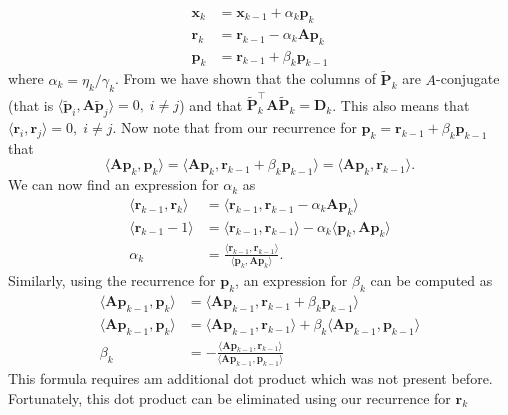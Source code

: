 \begin{align*}
    \bm{x}_k & = \bm{x}_{k-1} + \alpha_k \bm{p}_k        \\
    \bm{r}_k & = \bm{r}_{k-1} - \alpha_k \bm{A} \bm{p}_k \\
    \bm{p}_k & = \bm{r}_{k-1} + \beta_k \bm{p}_{k-1}
\end{align*}
where $\alpha_k = \eta_k / \gamma_k$. From  we have shown that the columns of $\tilde{\bm{P}}_k$ are $A$-conjugate (that is $\langle \tilde{\bm{p}}_i , \bm{A} \tilde{\bm{p}}_j \rangle = 0, \; i \neq j$) and that $\tilde{\bm{P}}_k^{\intercal} \bm{A} \tilde{\bm{P}}_k = \bm{D}_k$. This also means that $\langle \bm{r}_i , \bm{r}_j \rangle = 0, \; i \neq j$. Now note that from our recurrence for $\bm{p}_k = \bm{r}_{k-1} + \beta_k \bm{p}_{k-1}$ that
\[
    \langle \bm{A} \bm{p}_k ,\bm{p}_k \rangle = \langle \bm{A} \bm{p}_k , \bm{r}_{k-1} + \beta_k \bm{p}_{k-1} \rangle = \langle \bm{A} \bm{p}_k , \bm{r}_{k-1} \rangle.
\]
We can now find an expression for $\alpha_k$ as
\begin{align*}
    \langle \bm{r}_{k-1} , \bm{r}_{k} \rangle & = \langle \bm{r}_{k-1} , \bm{r}_{k-1} - \alpha_k \bm{A} \bm{p}_k \rangle                           \\
    \langle \bm{r}_{k-1} -1 \rangle           & = \langle \bm{r}_{k-1} , \bm{r}_{k-1} \rangle - \alpha_k \langle \bm{p}_k, \bm{A} \bm{p}_k \rangle \\
    \alpha_k                                  & = \frac{\langle \bm{r}_{k-1} , \bm{r}_{k-1} \rangle}{\langle \bm{p}_k, \bm{A} \bm{p}_k \rangle}.
\end{align*}
Similarly, using the recurrence for $\bm{p}_k$, an expression for $\beta_k$ can be computed as
\begin{align*}
    \langle \bm{A} \bm{p}_{k-1} , \bm{p}_k \rangle & = \langle \bm{A} \bm{p}_{k-1}, \bm{r}_{k-1} + \beta_k \bm{p}_{k-1} \rangle                                      \\
    \langle \bm{A} \bm{p}_{k-1} , \bm{p}_k \rangle & = \langle \bm{A} \bm{p}_{k-1}, \bm{r}_{k-1} \rangle + \beta_k \langle \bm{A} \bm{p}_{k-1}, \bm{p}_{k-1} \rangle \\
    \beta_k                                        & = - \frac{\langle \bm{A} \bm{p}_{k-1}, \bm{r}_{k-1} \rangle}{\langle \bm{A} \bm{p}_{k-1}, \bm{p}_{k-1} \rangle}
\end{align*}
This formula requires am additional dot product which was not present before. Fortunately, this dot product can be eliminated using our recurrence for $\bm{r}_k$
